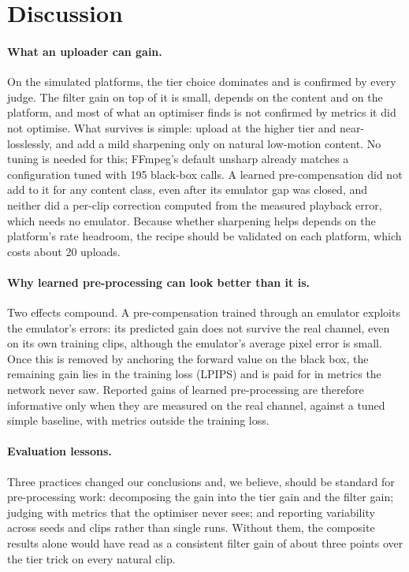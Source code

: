 \section{Discussion}
\label{sec:discussion}

\paragraph{What an uploader can gain.}
On the simulated platforms, the tier choice dominates and is confirmed by every judge. The filter
gain on top of it is small, depends on the content and on the platform, and most of what an
optimiser finds is not confirmed by metrics it did not optimise. What survives is simple: upload at
the higher tier and near-losslessly, and add a mild sharpening only on natural low-motion content.
No tuning is needed for this; FFmpeg's default unsharp already matches a configuration tuned with 195
black-box calls. A learned pre-compensation did not add to it for any content class, even after its
emulator gap was closed, and neither did a per-clip correction computed from the measured playback
error, which needs no emulator. Because whether sharpening helps depends on the platform's rate headroom, the
recipe should be validated on each platform, which costs about 20 uploads.

\paragraph{Why learned pre-processing can look better than it is.}
Two effects compound. A pre-compensation trained through an emulator exploits the emulator's errors:
its predicted gain does not survive the real channel, even on its own training clips, although the
emulator's average pixel error is small. Once this is removed by anchoring the forward value on the
black box, the remaining gain lies in the training loss (LPIPS) and is paid for in metrics the network
never saw. Reported gains of learned pre-processing are therefore informative only when they are
measured on the real channel, against a tuned simple baseline, with metrics outside the training
loss.

\paragraph{Evaluation lessons.}
Three practices changed our conclusions and, we believe, should be standard for pre-processing work:
decomposing the gain into the tier gain and the filter gain; judging with metrics that the optimiser
never sees; and reporting variability across seeds and clips rather than single runs. Without them,
the composite results alone would have read as a consistent filter gain of about three points over
the tier trick on every natural clip.

